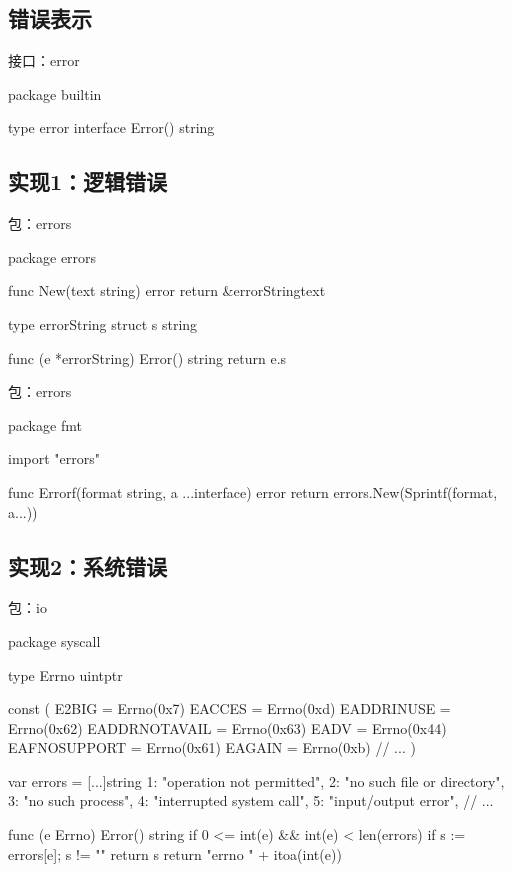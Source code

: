 \begin{content}

\subsection{错误表示}

\begin{nodiff}{接口：error}
 \begin{go}
package builtin

type error interface {
	Error() string
}
 \end{go}
\end{nodiff}

\subsection{实现1：逻辑错误}

\begin{nodiff}{包：errors}
 \begin{go}
package errors

func New(text string) error {
	return &errorString{text}
}

type errorString struct {
	s string
}

func (e *errorString) Error() string {
	return e.s
}
 \end{go}
\end{nodiff}

\begin{nodiff}{包：errors}
 \begin{go}
package fmt

import "errors"

func Errorf(format string, a ...interface{}) error {
	return errors.New(Sprintf(format, a...))
}
 \end{go}
\end{nodiff}

\subsection{实现2：系统错误}

\begin{nodiff}{包：io}
 \begin{go}
package syscall

type Errno uintptr

const (
	E2BIG           = Errno(0x7)
	EACCES          = Errno(0xd)
	EADDRINUSE      = Errno(0x62)
	EADDRNOTAVAIL   = Errno(0x63)
	EADV            = Errno(0x44)
	EAFNOSUPPORT    = Errno(0x61)
	EAGAIN          = Errno(0xb)
    // ...
)

var errors = [...]string{
	1:   "operation not permitted",
	2:   "no such file or directory",
	3:   "no such process",
	4:   "interrupted system call",
	5:   "input/output error",
    // ...
}

func (e Errno) Error() string {
	if 0 <= int(e) && int(e) < len(errors) {
		if s := errors[e]; s != "" {
			return s
		}
	}
	return "errno " + itoa(int(e))
}
 \end{go}
\end{nodiff}

\end{content}
